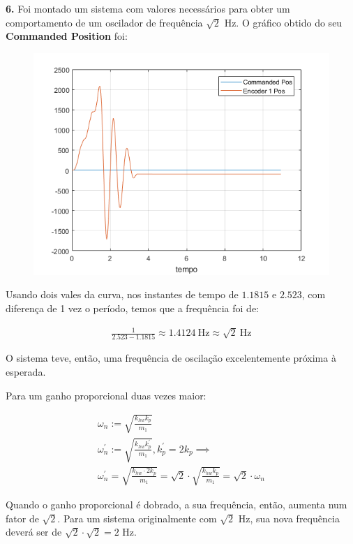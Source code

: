 \documentclass[a4paper,11pt]{article}
\begin{document}
\textbf{6.}
Foi montado um sistema com valores necessários para obter um comportamento de um
oscilador de frequência $\sqrt{2}$ Hz. O gráfico obtido do seu
\textbf{Commanded Position} foi:

\begin{figure}[H]
\includegraphics{q04}
\centering
\end{figure}

Usando dois vales da curva, nos instantes de tempo de $1.1815$ e $2.523$,
com diferença de 1 vez o período, temos que a frequência foi de:

\begin{gather*}
    \frac{1}{2.523 - 1.1815} \approx 1.4124~\text{Hz}
        \approx \sqrt{2}~\text{Hz}
\end{gather*}

O sistema teve, então, uma frequência de oscilação excelentemente próxima à
esperada.

Para um ganho proporcional duas vezes maior:

\begin{gather*}
    \omega_n := \sqrt{\frac{k_{hw}k_p}{m_1}} \\
    \omega_n^\prime := \sqrt{\frac{k_{hw}k_p^\prime}{m_1}}, k_p^\prime = 2k_p
        \implies \\
    \omega_n^\prime = \sqrt{\frac{k_{hw} \cdot 2k_p}{m_1}} =
        \sqrt{2} \cdot \sqrt{\frac{k_{hw} k_p}{m_1}} =
        \sqrt{2} \cdot \omega_n
\end{gather*}

Quando o ganho proporcional é dobrado, a sua frequência, então, aumenta num
fator de $\sqrt{2}$. Para um sistema originalmente com $\sqrt{2}$ Hz, sua nova
frequência deverá ser de $\sqrt{2} \cdot \sqrt{2} = 2$ Hz.
\end{document}
